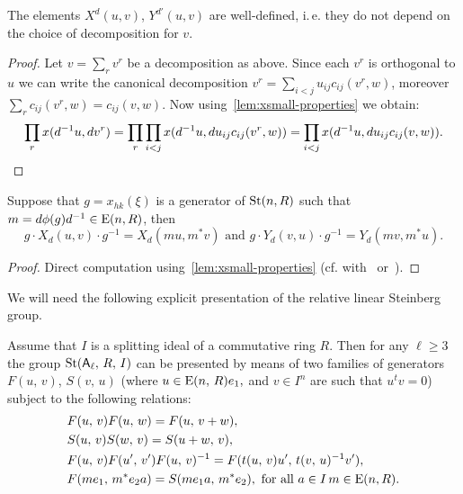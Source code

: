 \begin{lemma}
    \label{lem:xy-wd}
    The elements $X^d(u, v)$, $Y^{d'}(u, v)$ are well-defined, i.\,e. they do not depend on the choice of decomposition for $v$.
\end{lemma}
\begin{proof}
    Let $v = \sum_r v^r$ be a decomposition as above.
    Since each $v^r$ is orthogonal to $u$ we can write the canonical decomposition
    $v^r = \sum_{i<j} u_{ij} c_{ij}(v^r, w)$, moreover $\sum_{r} c_{ij}(v^r, w) = c_{ij}(v, w)$.
    Now using~\cref{lem:xsmall-properties} we obtain:
    \begin{multline*}
        \prod\limits_r x(d^{-1}u, dv^r) = \prod\limits_{r}\prod\limits_{i<j} x(d^{-1} u, du_{ij}c_{ij}(v^r, w)) =
        \prod\limits_{i<j} x(d^{-1} u, d u_{ij}c_{ij}(v, w)). \qedhere
    \end{multline*}
\end{proof}

\begin{lemma}
    \label{lem:xy-conj} Suppose that $g = x_{hk}(\xi)$ is a generator of $\operatorname{St}(n, R)$ such that $m = d\phi(g)d^{-1} \in \operatorname{E}(n, R)$, then
    \begin{equation*}
        g \cdot X_d(u, v) \cdot g^{-1} = X_d(mu, m^*v) \text{ and } g \cdot Y_d(v, u) \cdot g^{-1} = Y_d(mv, m^*u).
    \end{equation*}
\end{lemma}
\begin{proof}
    Direct computation using~\cref{lem:xsmall-properties} (cf. with~\cite[3.14]{Ka77} or~\cite[Lemma~4.4d]{LS17}).
\end{proof}

We will need the following explicit presentation of the relative linear Steinberg group.
\begin{prop}
    \label{prop:rel-presentation}
    Assume that $I$ is a splitting ideal of a commutative ring $R$.
    Then for any $\ell\geq 3$ the group $\operatorname{St}(\mathsf{A}_\ell,\,R,\,I)$ can be presented by means of two families of generators $F(u,\,v)$, $S(v,\,u)$
    (where $u\in \operatorname{E}(n,\,R)e_1,$ and $v\in I^n$ are such that $u^{t}v=0$) subject to the following relations:
    \begin{align}
        &F(u,\,v)F(u,\,w)=F(u,\,v+w), \label{add4}\\
        &S(u,\,v)S(w,\,v)=S(u+w,\,v), \label{add5}\\
        &F(u,\,v)F(u',\,v')F(u,\,v)^{-1}=F(t(u,\,v)u',\,t(v,\,u)^{-1} v'), \label{conj3} \\
        &F(me_1,\,m^{*}e_{2}a)=S(me_{1}a,\,m^{*}e_{2}),\ \text{for all $a\in I$}\, m \in \operatorname{E}(n, R). \label{coef-move}
    \end{align}
\end{prop}
